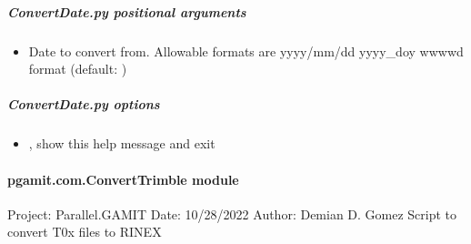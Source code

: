 \documentclass[letterpaper,10pt,english]{sphinxmanual}
\begin{document}
\subparagraph{ConvertDate.py positional arguments}
\label{\detokenize{pgamit.com:ConvertDate.py-positional-arguments}}\begin{itemize}
\item {} 
\sphinxAtStartPar
{\hyperref[\detokenize{pgamit.com:ConvertDate.py-date-to-convert}]{}} \sphinxhyphen{} Date to convert from. Allowable formats are yyyy/mm/dd yyyy\_doy wwww\sphinxhyphen{}d format (default: )

\end{itemize}


\subparagraph{ConvertDate.py options}
\label{\detokenize{pgamit.com:ConvertDate.py-options}}\begin{itemize}
\item {} 
\sphinxAtStartPar
{\hyperref[\detokenize{pgamit.com:ConvertDate.py--h}]{}}, {\hyperref[\detokenize{pgamit.com:ConvertDate.py---help}]{}} \sphinxhyphen{} show this help message and exit

\end{itemize}


\paragraph{pgamit.com.ConvertTrimble module}
\label{\detokenize{pgamit.com:module-pgamit.com.ConvertTrimble}}\label{\detokenize{pgamit.com:pgamit-com-converttrimble-module}}
\sphinxAtStartPar
Project: Parallel.GAMIT
Date: 10/28/2022
Author: Demian D. Gomez
Script to convert T0x files to RINEX

\begin{fulllineitems}
\label{\detokenize{pgamit.com:pgamit.com.ConvertTrimble.main}}
\pysigstartsignatures
\pysiglinewithargsret
{}
{}
{}
\pysigstopsignatures
\end{fulllineitems}
\end{document}
